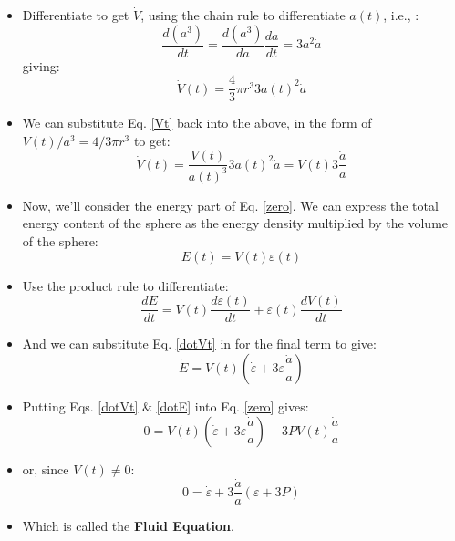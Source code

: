 \documentclass[11pt]{article}
\begin{document}
\begin{itemize}
\begin{equation}
\end{equation}
\item Differentiate to get $\dot{V}$, using the chain rule to differentiate $a(t)$, i.e., :
\begin{equation}
    \frac{d(a^3)}{dt} = \frac{d(a^3)}{da}\frac{da}{dt} = 3a^2\dot{a}
\end{equation}
giving:
\begin{equation}
    \dot{V}(t) = \frac{4}{3}\pi r^3 3a(t)^2\dot{a}
\end{equation}
\item We can substitute Eq. \ref{Vt} back into the above, in the form of $V(t)/a^3 = 4/3 \pi r^3$ to get:
\begin{equation}
    \label{dotVt}
    \dot{V}(t) = \frac{V(t)}{a(t)^3} 3a(t)^2\dot{a} = V(t) 3\frac{\dot{a}}{a}
\end{equation}
\item Now, we'll consider the energy part of Eq. \ref{zero}. We can express the total energy content of the sphere as the energy density multiplied by the volume of the sphere:
\begin{equation}
    E(t) = V(t)\varepsilon(t)
\end{equation}
\item Use the product rule to differentiate:
\begin{equation}
    \frac{dE}{dt} = V(t)\frac{d\varepsilon(t)}{dt} + \varepsilon(t)\frac{dV(t)}{dt}
\end{equation}
\item And we can substitute Eq. \ref{dotVt} in for the final term to give:
\begin{equation}
    \label{dotE}
    \dot{E} = V(t)\left(\dot{\varepsilon} + 3\varepsilon\frac{\dot{a}}{a}\right)
\end{equation}
\item Putting Eqs. \ref{dotVt} \& \ref{dotE} into Eq. \ref{zero} gives: 
\begin{equation}
    0 = V(t)\left(\dot{\varepsilon} + 3\varepsilon\frac{\dot{a}}{a}\right) + 3PV(t)\frac{\dot{a}}{a}
\end{equation}
\item or, since $V(t)\ne 0$:
\begin{equation}
    0 = \dot{\varepsilon} + 3\frac{\dot{a}}{a}\left(\varepsilon + 3P\right)
\end{equation}
\item Which is called the {\bf Fluid Equation}.
\end{itemize}
\end{document}
